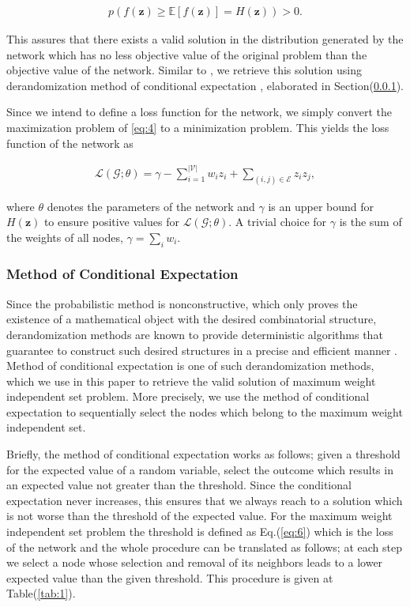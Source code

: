 \documentclass{article}
\begin{document}
\begin{gather}
	\label{eq:5}
	p\left(f(\mathbf{z}) \geq \mathbb{E}[f(\mathbf{z})] = H(\mathbf{z})\right) > 0.
\end{gather}

This assures that there exists a valid solution in the distribution generated by the network which has no less objective value of the original problem than the objective value of the network. Similar to \cite{erdos}, we retrieve this solution using derandomization method of conditional expectation \cite{probabilisticmethod}, elaborated in Section(\ref{subsubsec:ce}).

Since we intend to define a loss function for the network, we simply convert the maximization problem of \ref{eq:4} to a minimization problem. This yields the loss function of the network as

\begin{gather}
	\label{eq:a6}
	\mathcal{L}(\mathcal{G};\theta) = \gamma - \sum_{i=1}^{|\mathcal{V}|} w_iz_i + \sum_{(i, j) \in \mathcal{E}}z_iz_j,
\end{gather}

where $\theta$ denotes the parameters of the network and $\gamma$ is an upper bound for $H(\mathbf{z})$ to ensure positive values for $\mathcal{L}(\mathcal{G};\theta)$. A trivial choice for $\gamma$ is the sum of the weights of all nodes, $\gamma = \sum_{i}w_i$.

\subsubsection{Method of Conditional Expectation}
\label{subsubsec:ce}

Since the probabilistic method is nonconstructive, which only proves the existence of a mathematical object with the desired combinatorial structure, derandomization methods are known to provide deterministic algorithms that guarantee to construct such desired structures in a precise and efficient manner \cite{raghavan}. Method of conditional expectation is one of such derandomization methods, which we use in this paper to retrieve the valid solution of maximum weight independent set problem. More precisely, we use the method of conditional expectation to sequentially select the nodes which belong to the maximum weight independent set.

Briefly, the method of conditional expectation works as follows; given a threshold for the expected value of a random variable, select the outcome which results in an expected value not greater than the threshold. Since the conditional expectation never increases, this ensures that we always reach to a solution which is not worse than the threshold of the expected value. For the maximum weight independent set problem the threshold is defined as Eq.(\ref{eq:6}) which is the loss of the network and the whole procedure can be translated as follows; at each step we select a node whose selection and removal of its neighbors leads to a lower expected value than the given threshold. This procedure is given at Table(\ref{tab:1}). 
\end{document}
